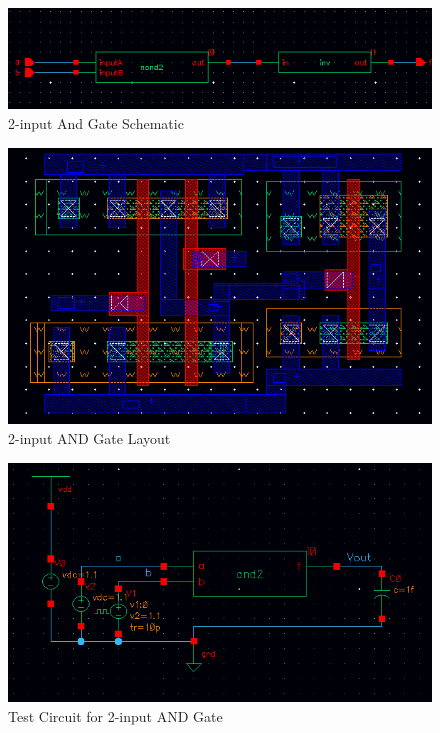 \documentclass[12pt]{article}
\begin{document}
\begin{figure}[H]
\centering
\includegraphics[width=\linewidth]{and2-schematic}
\caption{2-input And Gate Schematic}
\label{fig:and2-schematic}
\end{figure}

\begin{figure}[H]
\centering
\includegraphics[width=\linewidth]{and2-layout}
\caption{2-input AND Gate Layout}
\label{fig:and2-layout}
\end{figure}


\begin{figure}[H]
\centering
\includegraphics[width=\linewidth]{and2-test-circuit}
\caption{Test Circuit for 2-input AND Gate}
\label{fig:and2-test-circuit}
\end{figure}
\end{document}
